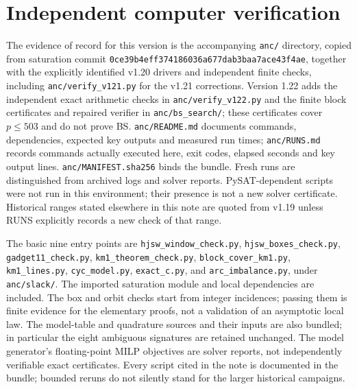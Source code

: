 \documentclass[11pt]{article}
\theoremstyle{remark}
\begin{document}
\section{Independent computer verification}

The evidence of record for this version is the accompanying \texttt{anc/} directory, copied from saturation commit
\texttt{0ce39b4eff374186036a677dab3baa7ace43f4ae}, together with the explicitly identified v1.20 drivers and independent finite checks, including \texttt{anc/verify\_v121.py} for the v1.21 corrections.
Version 1.22 adds the independent exact arithmetic checks in \texttt{anc/verify\_v122.py} and the finite block certificates
and repaired verifier in \texttt{anc/bs\_search/}; these certificates cover $p\le503$ and do not prove BS.
\texttt{anc/README.md} documents commands, dependencies, expected key outputs and measured run times;
\texttt{anc/RUNS.md} records commands actually executed here, exit codes, elapsed seconds and key output lines.
\texttt{anc/MANIFEST.sha256} binds the bundle.  Fresh runs are distinguished from archived logs and solver reports.
PySAT-dependent scripts were not run in this environment; their presence is not a new solver certificate.
Historical ranges stated elsewhere in this note are quoted from v1.19 unless RUNS explicitly records a new check of that range.

{\raggedright
The basic nine entry points are \texttt{hjsw\_\allowbreak window\_\allowbreak check.py}, \texttt{hjsw\_\allowbreak boxes\_\allowbreak check.py}, \texttt{gadget11\_check.py},
\texttt{km1\_\allowbreak theorem\_\allowbreak check.py}, \texttt{block\_\allowbreak cover\_\allowbreak km1.py}, \texttt{km1\_lines.py}, \texttt{cyc\_model.py},
\texttt{exact\_c.py}, and \texttt{arc\_imbalance.py}, under \texttt{anc/slack/}.
The imported saturation module and local dependencies are included.  The box and orbit checks start from integer incidences;
passing them is finite evidence for the elementary proofs, not a validation of an asymptotic local law.
The model-table and quadrature sources and their inputs are also bundled; in particular the eight ambiguous signatures are retained unchanged.
The model generator's floating-point MILP objectives are solver reports, not independently verifiable exact certificates.
Every script cited in the note is documented in the bundle; bounded reruns do not silently stand for the larger historical campaigns.
\par}
\end{document}
